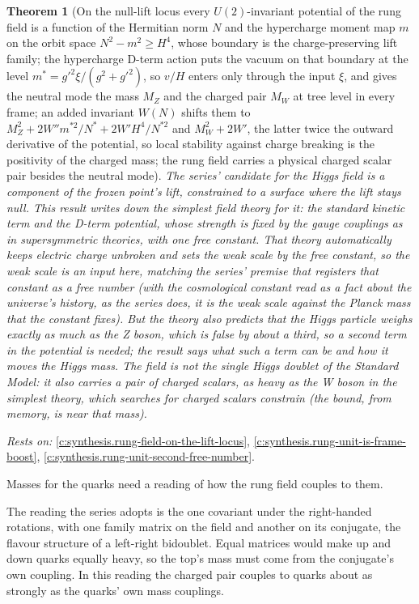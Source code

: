 \documentclass[11pt]{article}
\newtheorem{theorem}{Theorem}[section]
\theoremstyle{definition}
\theoremstyle{plain}
\begin{document}
\begin{theorem}[On the null-lift locus every $U(2)$-invariant potential of the rung field is a function of the Hermitian norm $N$ and the hypercharge moment map $m$ on the orbit space $N^{2} - m^{2} \ge H^{4}$, whose boundary is the charge-preserving lift family; the hypercharge D-term action puts the vacuum on that boundary at the level $m^{*} = g'^{2}\xi/(g^{2} + g'^{2})$, so $v/H$ enters only through the input $\xi$, and gives the neutral mode the mass $M_{Z}$ and the charged pair $M_{W}$ at tree level in every frame; an added invariant $W(N)$ shifts them to $M_{Z}^{2} + 2W''m^{*2}/N^{*} + 2W'H^{4}/N^{*2}$ and $M_{W}^{2} + 2W'$, the latter twice the outward derivative of the potential, so local stability against charge breaking is the positivity of the charged mass; the rung field carries a physical charged scalar pair besides the neutral mode]\label{c:synthesis.rung-field-d-term-action-and-tree-masses-on-the-lift-locus}
The series' candidate for the Higgs field is a component of the frozen point's lift, constrained to a surface where the lift stays null. This result writes down the simplest field theory for it: the standard kinetic term and the D-term potential, whose strength is fixed by the gauge couplings as in supersymmetric theories, with one free constant. That theory automatically keeps electric charge unbroken and sets the weak scale by the free constant, so the weak scale is an input here, matching the series' premise that registers that constant as a free number (with the cosmological constant read as a fact about the universe's history, as the series does, it is the weak scale against the Planck mass that the constant fixes). But the theory also predicts that the Higgs particle weighs exactly as much as the Z boson, which is false by about a third, so a second term in the potential is needed; the result says what such a term can be and how it moves the Higgs mass. The field is not the single Higgs doublet of the Standard Model: it also carries a pair of charged scalars, as heavy as the W boson in the simplest theory, which searches for charged scalars constrain (the bound, from memory, is near that mass).
\end{theorem}
\noindent\emph{Rests on:} \ref{c:synthesis.rung-field-on-the-lift-locus}, \ref{c:synthesis.rung-unit-is-frame-boost}, \ref{c:synthesis.rung-unit-second-free-number}.

Masses for the quarks need a reading of how the rung field couples to them.

The reading the series adopts is the one covariant under the right-handed rotations, with one family matrix on the field and another on its conjugate, the flavour structure of a left-right bidoublet. Equal matrices would make up and down quarks equally heavy, so the top's mass must come from the conjugate's own coupling. In this reading the charged pair couples to quarks about as strongly as the quarks' own mass couplings.
\end{document}
